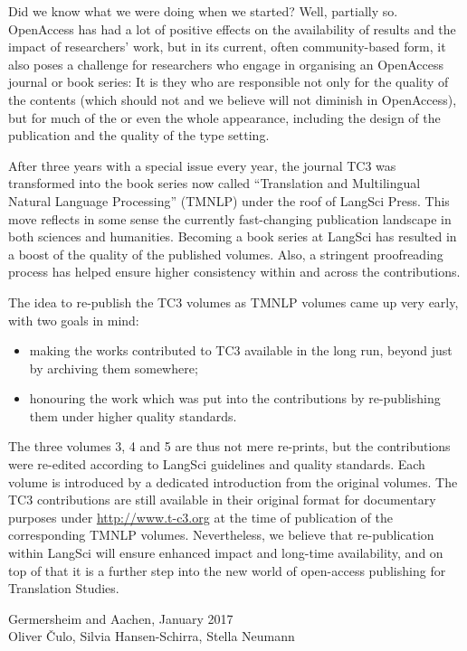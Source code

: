 Did we know what we were doing when we started? Well, partially so. OpenAccess has had a lot of positive effects on the availability of results and the impact of researchers' work, but in its current, often community-based form, it also poses a challenge for researchers who engage in organising an OpenAccess journal or book series: It is they who are responsible not only for the quality of the contents (which should not and we believe will not diminish in OpenAccess), but for much of the or even the whole appearance, including the design of the publication and the quality of the type setting.

After three years with a special issue every year, the journal TC3 was transformed into the book series now called ``Translation and Multilingual Natural Language Processing'' (TMNLP) under the roof of LangSci Press. This move reflects in some sense the currently fast-changing publication landscape in both sciences and humanities. Becoming a book series at LangSci has resulted in a boost of the quality of the published volumes. Also, a stringent proofreading process has helped ensure higher consistency within and across the contributions.

The idea to re-publish the TC3 volumes as TMNLP volumes came up very early, with two goals in mind:
\begin{itemize}
\item making the works contributed to TC3 available in the long run, beyond just by archiving them somewhere;
\item honouring the work which was put into the contributions by re-publishing them under higher quality standards.
\end{itemize}

The three volumes 3, 4 and 5 are thus not mere re-prints, but the contributions were re-edited according to LangSci guidelines and quality standards. Each volume is introduced by a dedicated introduction from the original volumes. The TC3 contributions are still available in their original format for documentary purposes under \url{http://www.t-c3.org} at the time of publication of the corresponding TMNLP volumes. Nevertheless, we believe that re-publication within LangSci will ensure enhanced impact and long-time availability, and on top of that it is a further step into the new world of open-access publishing for Translation Studies.

\bigskip
\hfill Germersheim and Aachen, January 2017 \\
\bigskip
\hfill Oliver Čulo, Silvia Hansen-Schirra, Stella Neumann

\printbibliography[heading=subbibliography,notkeyword=this]

